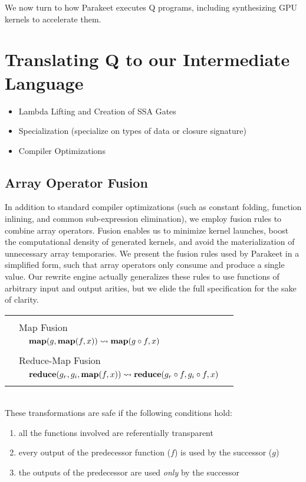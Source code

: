 \documentclass[preprint]{sigplanconf}
\begin{document}
We now turn to how Parakeet executes Q programs, including synthesizing GPU
kernels to accelerate them.

\section{Translating Q to our Intermediate Language}
\label{Compilation}
\begin{itemize}

\item Lambda Lifting and Creation of SSA Gates 
\item Specialization (specialize on types of data or closure signature) 
\item Compiler Optimizations
\end{itemize} 
\subsection{Array Operator Fusion}
In addition to standard compiler optimizations (such as constant folding, function inlining, and common sub-expression elimination), 
we employ fusion rules\cite{Jones01} to combine array operators. Fusion enables us to minimize kernel launches, boost the computational density of generated kernels, and
avoid the materialization of unnecessary array temporaries. 
We present the fusion rules used by Parakeet in a simplified form, such that array operators only consume and produce a single value. Our rewrite engine actually generalizes these rules to use functions of arbitrary input and output arities, but we elide the full specification for the sake of clarity. 
\\[5pt]
\begin{tabular}{|m{0.001cm} m{0.05cm} p{6.75cm} p{0.05cm} |}
  \hline 
  & &  & \\
  & \multicolumn{2}{l}{\large{Map Fusion} }  &  \\
  & & $\mbox{\textbf{map}}(g, \mbox{\textbf{map}}(f, x)) \leadsto \mbox{\textbf{map}}(g \circ f, x)$ & \\
  & & & \\
  & \multicolumn{2}{l}{\large{Reduce-Map Fusion} }  & \\
  & & $\mbox{\textbf{reduce}}(g_r, g_{i}, \mbox{\textbf{map}}(f, x)) \leadsto \mbox{\textbf{reduce}}(g_r \circ f, g_{i} \circ f, x)$ & \\
  & & & \\
  \hline
\end{tabular}\\[4pt]
These transformations are safe if the following conditions hold: 
\begin{enumerate}
\item all the functions involved are referentially transparent
\item every output of the predecessor function ($f$) is used by the successor ($g$)
\item the outputs of the predecessor are used \textit{only} by the successor 
\end{enumerate}
\end{document}
